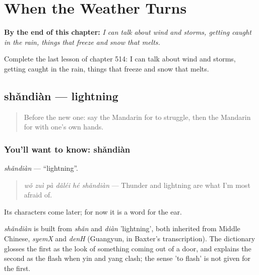 
\chapter{When the Weather Turns}
\label{ch:zh-when-the-weather-turns}

\begin{chapteropening}
\textbf{By the end of this chapter:} \emph{I can talk about wind and storms, getting caught in the rain, things that freeze and snow that melts.}

Complete the last lesson of chapter 514: I can talk about wind and storms, getting caught in the rain, things that freeze and snow that melts.
\end{chapteropening}

\section[shǎndiàn]{shǎndiàn — lightning}

\label{lesson:ZH-C514-shandian}



\begin{quote}
Before the new one: say the Mandarin for to struggle, then the Mandarin for with one's own hands.
\end{quote}

\subsection*{You'll want to know: shǎndiàn}
\emph{shǎndiàn} — \textquotedblleft{}lightning\textquotedblright{}.

\begin{quote}
\emph{wǒ zuì pà dǎléi hé shǎndiàn} — Thunder and lightning are what I'm most afraid of.
\end{quote}

Its characters come later; for now it is a word for the ear.

\begin{cousinweb}
\emph{shǎndiàn} is built from \emph{shǎn} and \emph{diàn} 'lightning', both inherited from Middle Chinese, \emph{syemX} and \emph{denH} (Guangyun, in Baxter's transcription). The dictionary glosses the first as the look of something coming out of a door, and explains the second as the flash when yin and yang clash; the sense 'to flash' is not given for the first.
\end{cousinweb}

